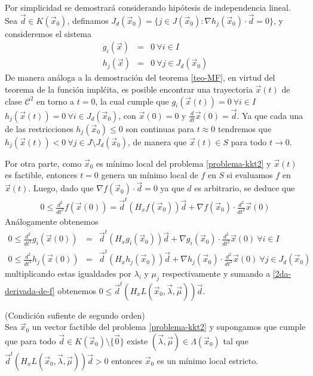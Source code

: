 \begin{demostracion}
Por simplicidad se demostrar\'a considerando hip\'otesis de independencia lineal. Sea $\vec{d}\in K(\vec{x}_0)$, definamos $J_d (\vec{x}_0) = \{j\in J(\vec{x}_0) : \nabla h_j(\vec{x}_0)\cdot \vec{d} = 0\}$, y consideremos el sistema 
\begin{eqnarray*}
g_i(\vec{x}) &=& 0 \:\forall i \in I \\
h_j(\vec{x}) &=& 0 \:\forall j\in J_d(\vec{x}_0)
\end{eqnarray*}
De manera an\'aloga a la demostraci\'on del teorema \ref{teo-MF}, en virtud del teorema de la funci\'on impl\'cita, es posible encontrar una trayectoria $\vec{x}(t)$ de clase $\mathcal{C}^2$ en torno a $t=0$, la cual cumple que $g_i(\vec{x}(t))=0 \:\forall i \in I$ $h_j(\vec{x}(t))=0 \:\forall i\in J_d (\vec{x}_0)$, con $\vec{x}(0)=0$ y 
$\frac{d}{dt}\vec{x}(0) = \vec{d}$. Ya que cada una de las restricciones $h_j(\vec{x}_0)\leq 0$ son continuas para $t\approx 0$ tendremos que $h_j(\vec{x}(t))< 0 \:\forall j\in J\setminus J_d(\vec{x}_0)$, de manera que $\vec{x}(t)\in S$ para todo $t \to 0$.

Por otra parte, como $\vec{x}_0$ es m\'inimo local del problema \ref{problema-kkt2} y $\vec{x}(t)$ es factible, entonces $t=0$ genera un m\'inimo local de $f$ en $S$ si evaluamos $f$ en $\vec{x}(t)$. Luego, dado que $\nabla f(\vec{x}_0)\cdot \vec{d} = 0$ ya que $d$ es arbitrario, se deduce que
\begin{gather}\label{2da-derivada-de-f} 
0\leq \frac{d^2}{dt^2} f(\vec{x}(0)) = \vec{d}^t (H_x f(\vec{x}_0)) \vec{d} + \nabla f(\vec{x}_0) \cdot \frac{d^2}{dt^2} \vec{x}(0) \tag{*}
\end{gather}
An\'alogamente obtenemos
\begin{eqnarray*}
0\leq \frac{d^2}{dt^2} g_i(\vec{x}(0)) &=& \vec{d}^t (H_x g_i(\vec{x}_0)) \vec{d} + \nabla g_i(\vec{x}_0) \cdot \frac{d^2}{dt^2} \vec{x}(0) \:\forall i \in I \\
0\leq \frac{d^2}{dt^2} h_j(\vec{x}(0)) &=& \vec{d}^t (H_x h_j(\vec{x}_0)) \vec{d} + \nabla h_j(\vec{x}_0) \cdot \frac{d^2}{dt^2} \vec{x}(0) \:\forall j \in J_d (\vec{x}_0)
\end{eqnarray*}
multiplicando estas igualdades por $\lambda_i$ y $\mu_j$ respectivamente y sumando a \eqref{2da-derivada-de-f} obtenemos
$0\leq \vec{d}^t (H_x L(\vec{x}_0,\vec{\lambda},\vec{\mu})) \vec{d}$.
\end{demostracion}

\begin{teorema}{\rm (Condici\'on sufiente de segundo orden)}\label{csso-kkt}
\\Sea $\vec{x}_0$ un vector factible del problema \ref{problema-kkt2} y supongamos que cumple que para todo $\vec{d}\in K(\vec{x}_0)\setminus \{\vec{0}\}$ existe $(\vec{\lambda},\vec{\mu})\in \Lambda(\vec{x}_0)$ tal que 
$\vec{d}^t(H_x L(\vec{x}_0,\vec{\lambda},\vec{\mu}))\vec{d} > 0$ entonces $\vec{x}_0$ es un m\'inimo local estricto.  
\end{teorema}

